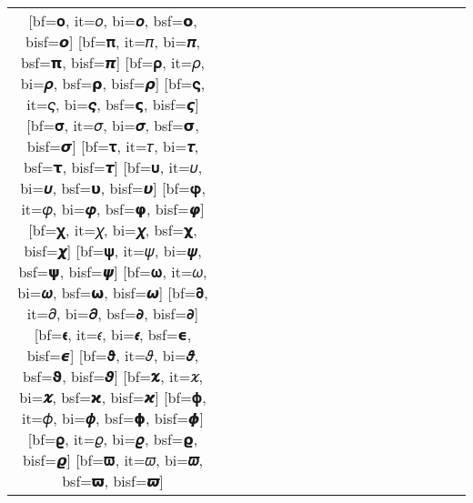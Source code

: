\documentclass{unittest}
\begin{document}
\begin{tabular}{cc|cc:cc:cc:cc|cc:cc:cc:cc}
[bf=𝛐, it=𝜊, bi=𝝄, bsf=𝝾, bisf=𝞸]
[bf=𝛑, it=𝜋, bi=𝝅, bsf=𝝿, bisf=𝞹]
[bf=𝛒, it=𝜌, bi=𝝆, bsf=𝞀, bisf=𝞺]
[bf=𝛓, it=𝜍, bi=𝝇, bsf=𝞁, bisf=𝞻]
[bf=𝛔, it=𝜎, bi=𝝈, bsf=𝞂, bisf=𝞼]
[bf=𝛕, it=𝜏, bi=𝝉, bsf=𝞃, bisf=𝞽]
[bf=𝛖, it=𝜐, bi=𝝊, bsf=𝞄, bisf=𝞾]
[bf=𝛗, it=𝜑, bi=𝝋, bsf=𝞅, bisf=𝞿]
[bf=𝛘, it=𝜒, bi=𝝌, bsf=𝞆, bisf=𝟀]
[bf=𝛙, it=𝜓, bi=𝝍, bsf=𝞇, bisf=𝟁]
[bf=𝛚, it=𝜔, bi=𝝎, bsf=𝞈, bisf=𝟂]
[bf=𝛛, it=𝜕, bi=𝝏, bsf=𝞉, bisf=𝟃]
\midrule%
[bf=𝛜, it=𝜖, bi=𝝐, bsf=𝞊, bisf=𝟄]
[bf=𝛝, it=𝜗, bi=𝝑, bsf=𝞋, bisf=𝟅]
[bf=𝛞, it=𝜘, bi=𝝒, bsf=𝞌, bisf=𝟆]
[bf=𝛟, it=𝜙, bi=𝝓, bsf=𝞍, bisf=𝟇]
[bf=𝛠, it=𝜚, bi=𝝔, bsf=𝞎, bisf=𝟈]
[bf=𝛡, it=𝜛, bi=𝝕, bsf=𝞏, bisf=𝟉]
\bottomrule
\end{tabular}
\end{document}
